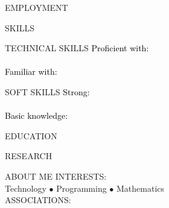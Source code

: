 \documentclass{style_classes/cv}
\newcommand{\tc}[2]{\textcolor{#1}{#2}}
\begin{document}
	\begin{multicols}{2}

		\begin{sectionname}
			{EMPLOYMENT}
			{
				
			}
		\end{sectionname}
	

		\begin{listlikeenv}
			{SKILLS}
			{
				\begin{skills}
					{TECHNICAL SKILLS}
					{\tc{black}{Proficient with:}\\
					\\
					\tc{black}{Familiar with:}\\
					}
				\end{skills}

				\begin{firstskills}
					{SOFT SKILLS}
					{\tc{black}{Strong:}\\
					\\
					\tc{black}{Basic knowledge:}\\
					}
				\end{firstskills}
			}
		\end{listlikeenv}

		 

		\begin{sectionname}
			{EDUCATION}
			{
				
		}
		\end{sectionname}

		\begin{listlikeenv}
			{RESEARCH}
			{\footnotesize \vspace{-0.5cm}
				
			}
		\end{listlikeenv}
		\begin{listlikeenv}
			{ABOUT ME}
			{   
				INTERESTS:\\
				\tc{nicegray}{Technology $\bullet$ Programming $\bullet$ Mathematics}\\
				ASSOCIATIONS:
				\tc{nicegray}{}
			}
		\end{listlikeenv}



\end{multicols}

 
 





\end{document}
